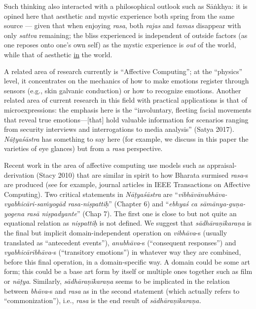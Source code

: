 Such thinking also interacted with a philosophical outlook such as Sāṅkhya: it is opined here that aesthetic and mystic experience both spring from the same source --- given that when enjoying \textsl{rasa}, both \textsl{rajas} and \textsl{tamas} disappear with only \textsl{sattva} remaining; the bliss experienced is independent of outside factors (as one reposes onto one’s own self) as the mystic experience is \textsl{out} of the world, while that of aesthetic \underline{in} the world.

A related area of research currently is “Affective Computing”; at the “physics” level, it concentrates on the mechanics of how to make emotions register through sensors (e.g., skin galvanic conduction) or how to recognize emotions. Another related area of current research in this field with practical applications is that of microexpressions: the emphasis here is the “involuntary, fleeting facial movements that reveal true emotions—[that] hold valuable information for scenarios ranging from security interviews and interrogations to media analysis” (Satya 2017). \textsl{Nāṭyaśāstra} has something to say here (for example, we discuss in this paper the varieties of eye glances) but from a \textsl{rasa} perspective.

Recent work in the area of affective computing use models such as appraisal-derivation (Stacy 2010) that are similar in spirit to how Bharata surmised \textsl{rasa}-s are produced (see for example, journal articles in IEEE Transactions on Affective Computing). Two critical statements in \textsl{Nāṭyaśāstra} are “\textsl{vibhāvānubhāva-vyabhicāri-saṁyogād rasa-niṣpattiḥ}” (Chapter 6) and “\textsl{ebhyaś ca sāmānya-guṇa-yogena rasā niṣpadyante}” (Chap 7). The first one is close to but not quite an equational relation as \textsl{niṣpattiḥ} is not defined. We suggest that \textsl{sādhāraṇīkaraṇa} is the final but implicit domain-independent operation on \textsl{vibhāva}-s (usually translated as “antecedent events”), \textsl{anubhāva}-s (“consequent responses”) and \textsl{vyabhicāribhāva}-s (“transitory emotions”) in whatever way they are combined, before this final operation, in a domain-specific way. A domain could be some art form; this could be a base art form by itself or multiple ones together such as film or \textsl{nāṭya}. Similarly, \textsl{sādhāraṇīkaraṇa} seems to be implicated in the relation between \hbox{\textsl{bhāva}-s} and \textsl{rasa} as in the second statement (which actually refers to “commonization”), i.e., \textsl{rasa} is the end result of \textsl{sādhāraṇīkaraṇa.}

